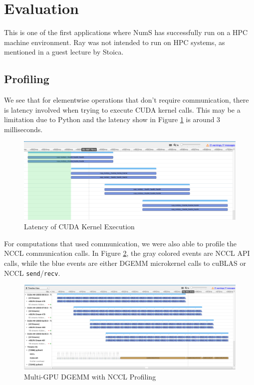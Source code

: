 \documentclass{article}
\begin{document}
\section{Evaluation}
This is one of the first applications where NumS has successfully run on a HPC machine environment. Ray was not intended to run on HPC systems, as mentioned in a guest lecture by Stoica. \cite{ray-lecture} 

\subsection{Profiling}
We see that for elementwise operations that don't require communication, there is latency involved when trying to execute CUDA kernel calls. This may be a limitation due to Python and the latency show in Figure \ref{fig:stream} is around 3 milliseconds. 

\begin{figure}
  \centerline{\includegraphics[width=6in]{figures/stream.png}}
  \caption{Latency of CUDA Kernel Execution}
  \label{fig:stream}
\end{figure}

For computations that used communication, we were also able to profile the NCCL communication calls. In Figure \ref{fig:nccl-dgemm}, the gray colored events are NCCL API calls, while the blue events are either DGEMM microkernel calls to cuBLAS or NCCL \verb|send|/\verb|recv|.

\begin{figure}
  \centerline{\includegraphics[width=6in]{hw/latex/figures/nccl-dgemm.png}}
  \caption{Multi-GPU DGEMM with NCCL Profiling}
  \label{fig:nccl-dgemm}
\end{figure}
\end{document}
